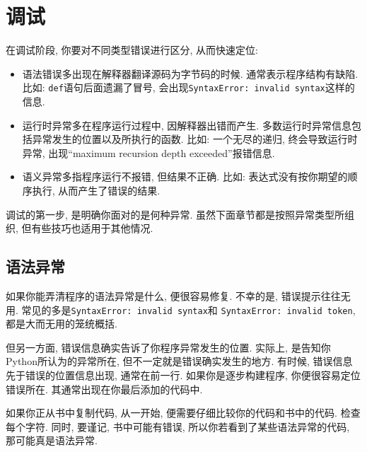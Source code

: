 \documentclass[10pt]{book}
\begin{document}
\appendix

\chapter{调试}

在调试阶段, 你要对不同类型错误进行区分, 从而快速定位:

\begin{itemize}

\item 语法错误多出现在解释器翻译源码为字节码的时候. 
通常表示程序结构有缺陷. 
比如: {\tt def}语句后面遗漏了冒号, 会出现{\tt SyntaxError: invalid syntax}这样的信息.

\item 运行时异常多在程序运行过程中, 因解释器出错而产生. 
多数运行时异常信息包括异常发生的位置以及所执行的函数. 
比如: 一个无尽的递归, 终会导致运行时异常, 出现``maximum recursion depth exceeded''报错信息.

\item 语义异常多指程序运行不报错, 但结果不正确.
比如: 表达式没有按你期望的顺序执行, 从而产生了错误的结果.

\end{itemize}

调试的第一步, 是明确你面对的是何种异常. 
虽然下面章节都是按照异常类型所组织, 但有些技巧也适用于其他情况. 


\section{语法异常}

如果你能弄清程序的语法异常是什么, 便很容易修复. 
不幸的是, 错误提示往往无用. 常见的多是{\tt SyntaxError: invalid syntax}和
{\tt SyntaxError: invalid token}, 都是大而无用的笼统概括. 

但另一方面, 错误信息确实告诉了你程序异常发生的位置. 
实际上, 是告知你Python所认为的异常所在, 但不一定就是错误确实发生的地方. 
有时候, 错误信息先于错误的位置信息出现, 通常在前一行. 
如果你是逐步构建程序, 你便很容易定位错误所在. 其通常出现在你最后添加的代码中. 

如果你正从书中复制代码, 从一开始, 便需要仔细比较你的代码和书中的代码. 
检查每个字符. 同时, 要谨记, 书中可能有错误, 所以你若看到了某些语法异常的代码, 
那可能真是语法异常. 
\end{document}
